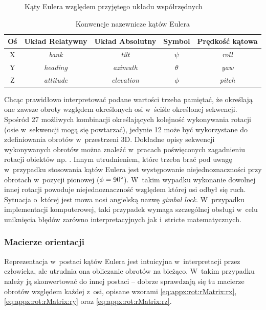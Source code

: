\begin{savenotes}
\begin{figure}[!htb]
		\caption{Kąty Eulera względem przyjętego układu współrzędnych}
		\label{fig:appx:rot:euler}
	\end{figure}
\end{savenotes}
																											
																											
\begin{table}
	\centering
	\caption{Konwencje nazewnicze kątów Eulera}
	\label{tab:appx:rot:eulerNames} 
	\begin{tabular}{|c|c|c|c|c|}
		\hline
		Oś & Układ Relatywny & Układ Absolutny & Symbol   & Prędkość kątowa \\
		\hline
		X   & \emph{bank}      & \emph{tilt}      & $\psi$   & \emph{roll}         \\
		Y   & \emph{heading}   & \emph{azimuth}   & $\theta$ & \emph{yaw}          \\ 
		Z   & \emph{attitude}  & \emph{elevation} & $\phi$   & \emph{pitch}        \\
		\hline
	\end{tabular} 
\end{table}
																													
Chcąc prawidłowo interpretować podane wartości trzeba pamiętać, że określają one zawsze obroty względem określonych osi w~ściśle określonej sekwencji. Spośród 27 możliwych kombinacji określających kolejność wykonywania rotacji (osie w~sekwencji mogą się powtarzać), jedynie 12 może być wykorzystane do zdefiniowania obrotów w~przestrzeni 3D. Dokładne opisy sekwencji wykonywanych obrotów można znaleźć w~pracach poświęconych zagadnieniu rotacji obiektów np. \cite{Pio1966, Diebel2006}. Innym utrudnieniem, które trzeba brać pod uwagę w~przypadku stosowania kątów Eulera jest występowanie niejednoznaczności przy obrotach w~pozycji pionowej ($ \phi=90\degree $). W~takim wypadku wykonanie dowolnej innej rotacji powoduje niejednoznaczność względem której osi odbył się ruch. Sytuacja o~której jest mowa nosi angielską nazwę \emph{gimbal lock}. W~przypadku implementacji komputerowej, taki przypadek wymaga szczególnej obsługi w~celu uniknięcia błędów zarówno interpretacyjnych jak i~stricte matematycznych.
																													
\subsubsection*{Macierze orientacji}
Reprezentacja w~postaci kątów Eulera jest intuicyjna w~interpretacji przez człowieka, ale utrudnia ona obliczanie obrotów na bieżąco. W~takim przypadku należy ją skonwertować do innej postaci -- dobrze sprawdzają się tu macierze obrotów względem każdej z~osi, opisane wzorami \ref{eq:appx:rot:rMatrix:rx}, \ref{eq:appx:rot:rMatrix:ry} oraz \ref{eq:appx:rot:rMatrix:rz}.
																													
